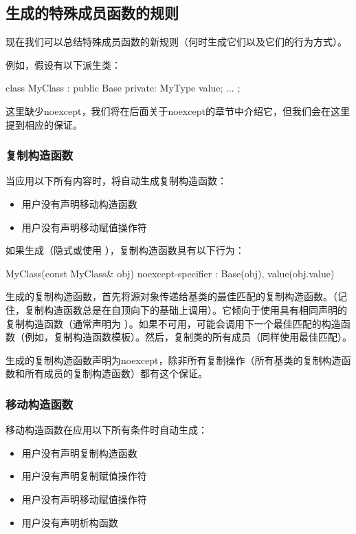 \subsection{生成的特殊成员函数的规则}

现在我们可以总结特殊成员函数的新规则（何时生成它们以及它们的行为方式）。

例如，假设有以下派生类：

\begin{cppcode}
class MyClass : public Base
{
private:
	MyType value;
	...
};
\end{cppcode}

这里缺少noexcept，我们将在后面关于noexcept的章节中介绍它，但我们会在这里提到相应的保证。

\subsubsection{复制构造函数}

当应用以下所有内容时，将自动生成复制构造函数：

\begin{itemize}
	\item 用户没有声明移动构造函数
	\item 用户没有声明移动赋值操作符
\end{itemize}

如果生成（隐式或使用 ），复制构造函数具有以下行为：

\begin{cppcode}
MyClass(const MyClass& obj) noexcept-specifier
: Base(obj), value(obj.value) {
}
\end{cppcode}

生成的复制构造函数，首先将源对象传递给基类的最佳匹配的复制构造函数。（记住，复制构造函数总是在自顶向下的基础上调用）。它倾向于使用具有相同声明的复制构造函数（通常声明为 ）。如果不可用，可能会调用下一个最佳匹配的构造函数（例如，复制构造函数模板）。然后，复制类的所有成员（同样使用最佳匹配）。

生成的复制构造函数声明为noexcept，除非所有复制操作（所有基类的复制构造函数和所有成员的复制构造函数）都有这个保证。

\subsubsection{移动构造函数}

移动构造函数在应用以下所有条件时自动生成：

\begin{itemize}
	\item 用户没有声明复制构造函数
	\item 用户没有声明复制赋值操作符
	\item 用户没有声明移动赋值操作符
	\item 用户没有声明析构函数
\end{itemize}

